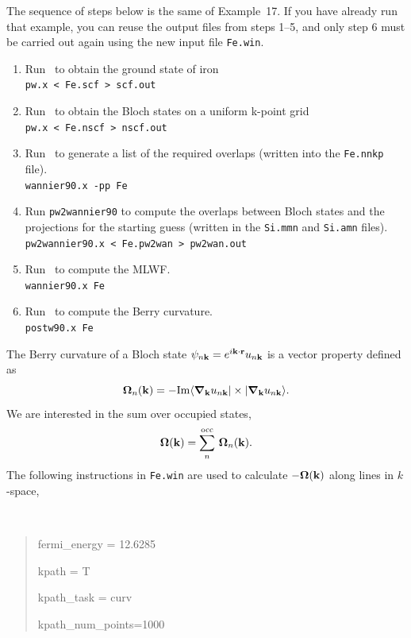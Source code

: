 \documentclass[a4paper,11pt,twoside]{article}
\begin{document}
The sequence of steps below is the same of Example~17.  If you have
already run that example, you can reuse the output files from steps
1--5, and only step 6 must be carried out again using the new input
file {\tt Fe.win}.

\begin{enumerate}
\item Run \pwscf\ to obtain the ground state of iron\\
{\tt pw.x < Fe.scf > scf.out}

\item Run \pwscf\ to obtain the Bloch states on a uniform k-point
  grid\\ 
{\tt pw.x < Fe.nscf > nscf.out}

\item Run \wannier\ to generate a list of the required overlaps (written
  into the {\tt Fe.nnkp} file).\\
{\tt wannier90.x -pp Fe}

\item Run {\tt pw2wannier90} to compute the overlaps between Bloch
  states and the projections for the starting guess (written in the
  {\tt Si.mmn} and {\tt  Si.amn} files).\\
{\tt pw2wannier90.x < Fe.pw2wan > pw2wan.out}

\item Run \wannier\ to compute the MLWF.\\
{\tt wannier90.x Fe}

\item Run \postw\ to compute the Berry curvature.\\
{\tt postw90.x Fe}

\end{enumerate}

The  Berry curvature of a Bloch state $\psi_{n{\bf k}}=e^{i{\bf k}\cdot {\bf r}}u_{n{\bf k}}$ is a vector property defined as
$$
\bm{\Omega}_n({\bf k})=-{\rm Im}
\langle \bm{\nabla}_{\bf k} u_{n{\bf k}}\vert \times
\vert\bm{\nabla}_{\bf k} u_{n{\bf k}}\rangle.
$$
%
We are interested in the sum over occupied states,
$$
\bm{\Omega}({\bf k})=\sum_n^{\rm occ}\,\bm{\Omega}_n({\bf k}).
$$
%
The following instructions in {\tt Fe.win} are used to calculate
$-\bm{\Omega}({\bf k})$ along lines in $k$-space, 
{\tt
\begin{quote}
fermi\_energy = 12.6285

kpath = T

kpath\_task = curv

kpath\_num\_points=1000
\end{quote} }
\end{document}
